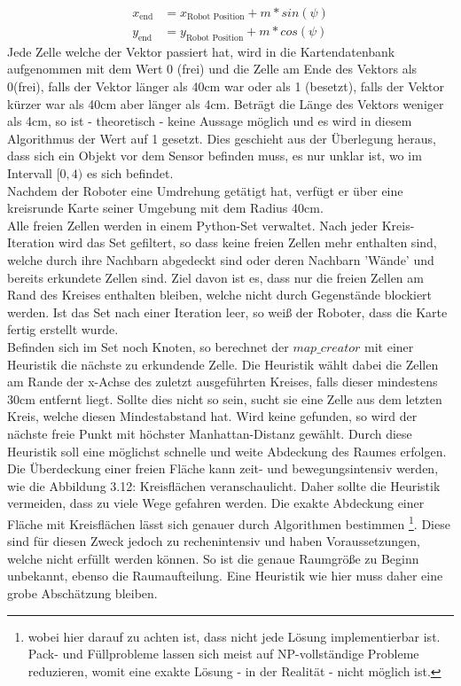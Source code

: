 \documentclass[twoside,11pt, a4paper]{report}
\begin{document}
	\begin{align}
	x_\text{end} &= x_\text{Robot Position} + m * sin(\psi)\\
	y_\text{end} &= y_\text{Robot Position} + m * cos(\psi)
	\end{align}
	Jede Zelle welche der Vektor passiert hat, wird in die Kartendatenbank aufgenommen mit dem Wert 0 (frei) und die Zelle am Ende des Vektors als 0(frei), falls der Vektor länger als 40cm war oder als 1 (besetzt), falls der Vektor kürzer war als 40cm aber länger als 4cm. Beträgt die Länge des Vektors weniger als 4cm, so ist - theoretisch - keine Aussage möglich und es wird in diesem Algorithmus der Wert auf 1 gesetzt. Dies geschieht aus der Überlegung heraus, dass sich ein Objekt vor dem Sensor befinden muss, es nur unklar ist, wo im Intervall $[0,4)$ es sich befindet. \\
	Nachdem der Roboter eine Umdrehung getätigt hat, verfügt er über eine kreisrunde Karte seiner Umgebung mit dem Radius 40cm. \\
	Alle freien Zellen werden in einem Python-Set verwaltet. Nach jeder Kreis-Iteration wird das Set gefiltert, so dass keine freien Zellen mehr enthalten sind, welche durch ihre Nachbarn abgedeckt sind oder deren Nachbarn 'Wände' und bereits erkundete Zellen sind. Ziel davon ist es, dass nur die freien Zellen am Rand des Kreises enthalten bleiben, welche nicht durch Gegenstände blockiert werden. Ist das Set nach einer Iteration leer, so weiß der Roboter, dass die Karte fertig erstellt wurde. \\
	Befinden sich im Set noch Knoten, so berechnet der $map\_creator$ mit einer Heuristik die nächste zu erkundende Zelle. Die Heuristik wählt dabei die Zellen am Rande der x-Achse des zuletzt ausgeführten Kreises, falls dieser mindestens 30cm entfernt liegt. Sollte dies nicht so sein, sucht sie eine Zelle aus dem letzten Kreis, welche diesen Mindestabstand hat. Wird keine gefunden, so wird der nächste freie Punkt mit höchster Manhattan-Distanz gewählt. Durch diese Heuristik soll eine möglichst schnelle und weite Abdeckung des Raumes erfolgen. \\
	Die Überdeckung einer freien Fläche kann zeit- und bewegungsintensiv werden, wie die Abbildung 3.12: Kreisflächen veranschaulicht. Daher sollte die Heuristik vermeiden, dass zu viele Wege gefahren werden. Die exakte Abdeckung einer Fläche mit Kreisflächen lässt sich genauer durch Algorithmen bestimmen \footnote{wobei hier darauf zu achten ist, dass nicht jede Lösung implementierbar ist. Pack- und Füllprobleme lassen sich meist auf NP-vollständige Probleme reduzieren, womit eine exakte Lösung - in der Realität -  nicht möglich ist. }. Diese sind für diesen Zweck jedoch zu rechenintensiv und haben Voraussetzungen, welche nicht erfüllt werden können. So ist die genaue Raumgröße zu Beginn unbekannt, ebenso die Raumaufteilung. Eine Heuristik wie hier muss daher eine grobe Abschätzung bleiben. 
\end{document}
